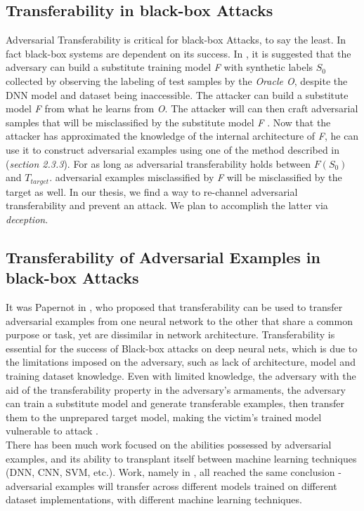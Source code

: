 \documentclass[grad,lot,lof,11pt,oneside,onehalfspace]{RUthesis}
\begin{document}
\subsection{Transferability in black-box Attacks}
Adversarial Transferability is critical for black-box Attacks, to say the least. In fact black-box systems are dependent on its success. In \cite{xiao_security_2017}, it is suggested that the adversary can build a substitute training model \textit{F} with synthetic labels \textit{$S_{0}$} collected by observing the labeling of test samples by the \textit{Oracle O}, despite the DNN model and dataset being inaccessible. The attacker can build a substitute model \textit{F} from what he learns from \textit{O}. The attacker will can then craft adversarial samples that will be misclassified by the substitute model \textit{F} \cite{papernot_distillation_2016}. Now that the attacker has approximated the knowledge of the internal architecture of \textit{F}, he can use it to construct adversarial examples using one of the method described in (\textit{section 2.3.3}). For as long as adversarial transferability holds between \textit{$F(S_{0})$} and \textit{$T_{target}$}. adversarial examples misclassified by \textit{F} will be misclassified by the target as well. In our thesis, we find a way to re-channel adversarial transferability and prevent an attack. We plan to accomplish the latter via \textit{deception}. 
\subsection{Transferability of Adversarial Examples in black-box Attacks}
It was Papernot in \cite{papernot_practical_2017}\cite{papernot_transferability_2016}, who proposed that transferability can be used to transfer adversarial examples from one neural network to the other that share a common purpose or task, yet are dissimilar in network architecture. Transferability is essential for the success of Black-box attacks on deep neural nets, which is due to the limitations imposed on the adversary, such as lack of architecture, model and training dataset knowledge. Even with limited knowledge, the adversary with the aid of the transferability property in the adversary's armaments, the adversary can train a substitute model and generate transferable examples, then transfer them to the unprepared target model, making the victim's trained model vulnerable to attack \cite{yuan_adversarial_2017}.\\
There has been much work focused on the abilities possessed by adversarial examples, and its ability to transplant itself between machine learning techniques (DNN, CNN, SVM, etc.). Work, namely in \cite{carlini_adversarial_2017} \cite{liu_delving_2017} \cite{papernot_practical_2017}, all reached the same conclusion - adversarial examples will transfer across different models trained on different dataset implementations, with different machine learning techniques. 
\end{document}
